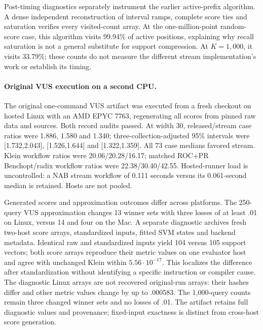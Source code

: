 Post-timing diagnostics separately instrument the earlier active-prefix
algorithm. A dense independent reconstruction of interval ramps, complete
score ties and saturation verifies every visited-count array. At the
one-million-point random-score case, this algorithm visits 99.94\% of active
positions, explaining why recall saturation is not a general substitute for
support compression. At $K=1{,}000$, it visits 33.79\%; these counts do not
measure the different stream implementation's work or establish its timing.

\paragraph{Original VUS execution on a second CPU.}
The original one-command VUS artifact was executed from a fresh checkout on
hosted Linux with an AMD EPYC 7763, regenerating all scores from pinned raw data
and sources. Both record audits passed. At width 30, released/stream case ratios
were 1.886, 1.580 and 1.340; three-collection-adjusted 95\% intervals were
[1.732,2.043], [1.526,1.644] and [1.322,1.359]. All 73 case medians favored
stream. Klein workflow ratios were 20.06/20.28/16.17; matched ROC+PR
Benchopt/radix workflow ratios were 22.38/30.40/42.55. Hosted-runner load is
uncontrolled: a NAB stream workflow of 0.111 seconds versus its 0.061-second
median is retained. Hosts are not pooled.

Generated scores and approximation outcomes differ across platforms. The
250-query VUS approximation changes 13 winner sets with three losses of at
least .01 on Linux, versus 14 and four on the Mac. A separate diagnostic
archives fresh two-host score arrays, standardized inputs, fitted SVM states
and backend metadata. Identical raw and standardized inputs yield 104 versus
105 support vectors; both score arrays reproduce their metric values on one
evaluator host and agree with unchanged Klein within $5.56\cdot10^{-17}$.
This localizes the difference after standardization without identifying a
specific instruction or compiler cause. The diagnostic Linux arrays are not
recovered original-run arrays: their hashes differ and other metric values
change by up to .000583. The 1,000-query counts remain three changed winner
sets and no losses of .01. The artifact retains full diagnostic values and
provenance; fixed-input exactness is distinct from cross-host score generation.

